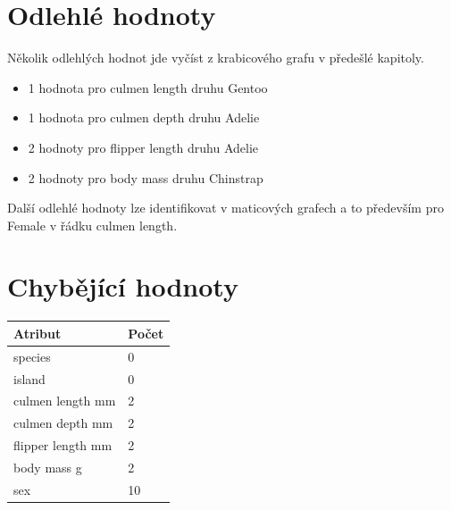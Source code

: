 \documentclass[10pt,xcolor=pdflatex,dvipsnames,table,oneside]{book}
\begin{document}
\section{Odlehlé hodnoty}
Několik odlehlých hodnot jde vyčíst z krabicového grafu v předešlé kapitoly.
\begin{itemize}
    \item 1 hodnota pro culmen length druhu Gentoo
    \item 1 hodnota pro culmen depth druhu Adelie
    \item 2 hodnoty pro flipper length druhu Adelie
    \item 2 hodnoty pro body mass druhu Chinstrap
\end{itemize}
Další odlehlé hodnoty lze identifikovat v maticových grafech a to především pro Female v řádku culmen length.

\section{Chybějící hodnoty}
\vspace{1em}
\begin{tabular}{|l|l|}
    \hline
    Atribut & Počet \\
    \hline
    \hline
    species           &  0 \\
    island            &  0 \\
    culmen length mm  &  2 \\
    culmen depth mm   &  2 \\
    flipper length mm &  2 \\
    body mass g       &  2 \\
    sex               & 10 \\
    \hline
\end{tabular}
\end{document}
